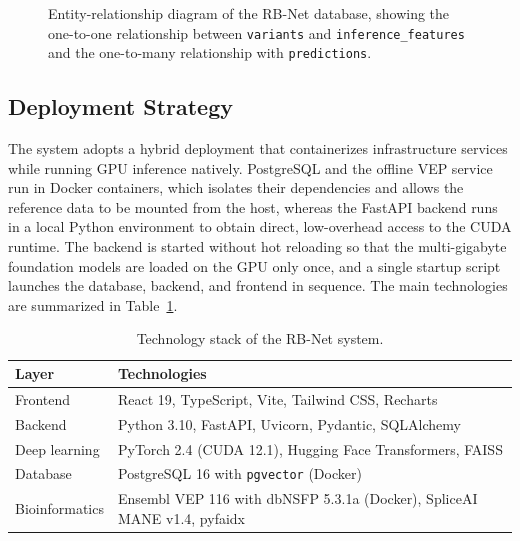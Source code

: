 \begin{figure}[htbp]
    \centering
    \caption{Entity-relationship diagram of the RB-Net database, showing the one-to-one relationship between \texttt{variants} and \texttt{inference\_features} and the one-to-many relationship with \texttt{predictions}.}
    \label{fig:db_erd}
\end{figure}

\subsection{Deployment Strategy}

The system adopts a hybrid deployment that containerizes infrastructure services while running GPU inference natively. PostgreSQL and the offline VEP service run in Docker containers, which isolates their dependencies and allows the reference data to be mounted from the host, whereas the FastAPI backend runs in a local Python environment to obtain direct, low-overhead access to the CUDA runtime. The backend is started without hot reloading so that the multi-gigabyte foundation models are loaded on the GPU only once, and a single startup script launches the database, backend, and frontend in sequence. The main technologies are summarized in Table~\ref{tab:tech_stack}.

\begin{table}[htbp]
    \centering
    \caption{Technology stack of the RB-Net system.}
    \label{tab:tech_stack}
    \begin{tabular}{ll}
        \toprule
        \textbf{Layer} & \textbf{Technologies} \\
        \midrule
        Frontend & React 19, TypeScript, Vite, Tailwind CSS, Recharts \\
        Backend & Python 3.10, FastAPI, Uvicorn, Pydantic, SQLAlchemy \\
        Deep learning & PyTorch 2.4 (CUDA 12.1), Hugging Face Transformers, FAISS \\
        Database & PostgreSQL 16 with \texttt{pgvector} (Docker) \\
        Bioinformatics & Ensembl VEP 116 with dbNSFP 5.3.1a (Docker), SpliceAI MANE v1.4, pyfaidx \\
        \bottomrule
    \end{tabular}
\end{table}

